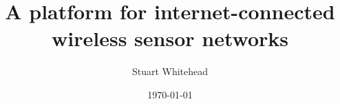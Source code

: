 \author{Stuart Whitehead}
\title{A platform for internet-connected wireless sensor networks}
\date{\today}
\maketitle